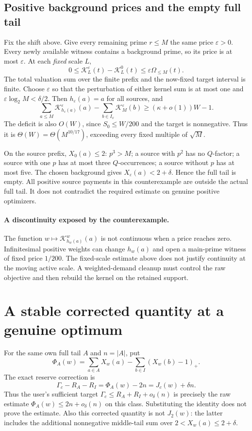 \documentclass[a4paper,11pt]{article}
\theoremstyle{remark}\newtheorem{remark}[theorem]{Remark}
\newcommand{\K}{\mathcal K}
\newcommand{\Om}{\Omega}
\begin{document}
\subsection{Positive background prices and the empty full tail}
Fix the shift above. Give every remaining prime $r\le M$ the same price $\varepsilon>0$. Every newly available witness contains a background prime, so its price is at most $\varepsilon$. At each \emph{fixed} scale $L$,
\[
 0\le\K_L^\varepsilon(t)-\K_L^0(t)
       \le\varepsilon\Om_{\le M}(t).
\]
The total valuation sum over the finite prefix and the now-fixed target interval is finite. Choose $\varepsilon$ so that the perturbation of either kernel sum is at most one and $\varepsilon\log_2M<\delta/2$. Then $h_\varepsilon(a)=a$ for all sources, and
\[
 \sum_{a\le M}\K_{h_\varepsilon(a)}^\varepsilon(a)
 -\sum_{b\in I_x}\K_M^\varepsilon(b)
 \ge(\kappa+o(1))W-1.
\]
The deficit is also $O(W)$, since $S_0\le W/200$ and the target is nonnegative. Thus it is $\Theta(W)=\Theta(M^{10/17})$, exceeding every fixed multiple of $\sqrt M$.

On the source prefix, $X_0(a)\le2$: $p^3>M$; a source with $p^2$ has no $Q$-factor; a source with one $p$ has at most three $Q$-occurrences; a source without $p$ has at most five. The chosen background gives $X_\varepsilon(a)<2+\delta$. Hence the full tail is empty. All positive source payments in this counterexample are outside the actual full tail. It does not contradict the required estimate on genuine positive optimizers.

\paragraph{A discontinuity exposed by the counterexample.}
The function $w\mapsto\K_{h_w(a)}^w(a)$ is not continuous when a price reaches zero. Infinitesimal positive weights can change $h_w(a)$ and open a main-prime witness of fixed price $1/200$. The fixed-scale estimate above does not justify continuity at the moving active scale. A weighted-demand cleanup must control the raw objective and then rebuild the kernel on the retained support.

\section{A stable corrected quantity at a genuine optimum}\label{sec:pruning}
For the same own full tail $A$ and $n=|A|$, put
\[
 \Phi_A(w)=\sum_{a\in A}X_w(a)-\sum_{b\in I}(X_w(b)-1)_+.
\]
The exact reserve correction is
\[
 \Gamma_c-R_A-R_I=\Phi_A(w)-2n=J_c(w)+\delta n.
\]
Thus the user's sufficient target $\Gamma_c\le R_A+R_I+o_\delta(n)$ is precisely the raw estimate $\Phi_A(w)\le2n+o_\delta(n)$ on this class. Substituting the identity does not prove the estimate. Also this corrected quantity is not $J_2(w)$: the latter includes the additional nonnegative middle-tail sum over $2<X_w(a)\le2+\delta$.
\end{document}
